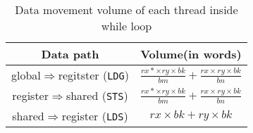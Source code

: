 \begin{table}[!t]
\caption{Data movement volume of each thread inside while loop}
\centering
\scalebox{1.0} {
\begin{tabular}{|c||c|}
\hline
    Data path& Volume(in words)\\
\hline
    global$\Rightarrow$regitster ({\tt LDG})& $\frac{rx*\times ry \times bk}{bm} + \frac{rx\times ry \times bk}{bn}$ \\
\hline
register$\Rightarrow$shared ({\tt STS})& $\frac{rx*\times ry \times bk}{bm} + \frac{rx\times ry \times bk}{bn}$ \\
\hline
shared$\Rightarrow$register ({\tt LDS})& $rx\times bk + ry\times bk$\\
\hline
\end{tabular}
}
\label{tab:reg}
\end{table}
